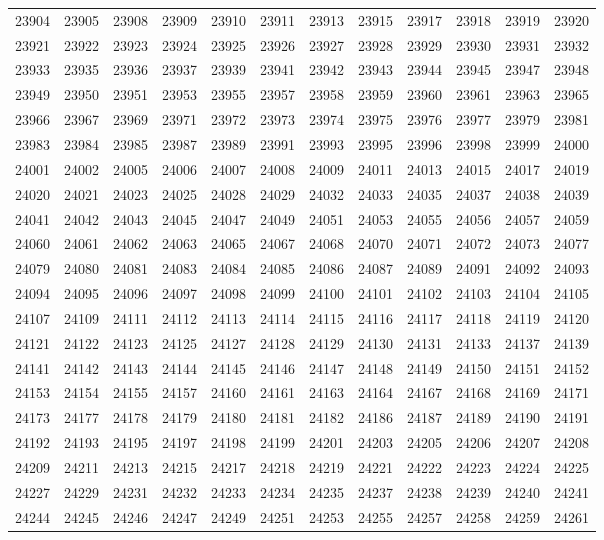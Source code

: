 \begin{center}
\begin{longtable}{llllllllllll}
23904 &23905 &23908 &23909 &23910 &23911 &23913 &23915 &23917 &23918 &23919 &23920 \\
23921 &23922 &23923 &23924 &23925 &23926 &23927 &23928 &23929 &23930 &23931 &23932 \\
23933 &23935 &23936 &23937 &23939 &23941 &23942 &23943 &23944 &23945 &23947 &23948 \\
23949 &23950 &23951 &23953 &23955 &23957 &23958 &23959 &23960 &23961 &23963 &23965 \\
23966 &23967 &23969 &23971 &23972 &23973 &23974 &23975 &23976 &23977 &23979 &23981 \\
23983 &23984 &23985 &23987 &23989 &23991 &23993 &23995 &23996 &23998 &23999 &24000 \\
24001 &24002 &24005 &24006 &24007 &24008 &24009 &24011 &24013 &24015 &24017 &24019 \\
24020 &24021 &24023 &24025 &24028 &24029 &24032 &24033 &24035 &24037 &24038 &24039 \\
24041 &24042 &24043 &24045 &24047 &24049 &24051 &24053 &24055 &24056 &24057 &24059 \\
24060 &24061 &24062 &24063 &24065 &24067 &24068 &24070 &24071 &24072 &24073 &24077 \\
24079 &24080 &24081 &24083 &24084 &24085 &24086 &24087 &24089 &24091 &24092 &24093 \\
24094 &24095 &24096 &24097 &24098 &24099 &24100 &24101 &24102 &24103 &24104 &24105 \\
24107 &24109 &24111 &24112 &24113 &24114 &24115 &24116 &24117 &24118 &24119 &24120 \\
24121 &24122 &24123 &24125 &24127 &24128 &24129 &24130 &24131 &24133 &24137 &24139 \\
24141 &24142 &24143 &24144 &24145 &24146 &24147 &24148 &24149 &24150 &24151 &24152 \\
24153 &24154 &24155 &24157 &24160 &24161 &24163 &24164 &24167 &24168 &24169 &24171 \\
24173 &24177 &24178 &24179 &24180 &24181 &24182 &24186 &24187 &24189 &24190 &24191 \\
24192 &24193 &24195 &24197 &24198 &24199 &24201 &24203 &24205 &24206 &24207 &24208 \\
24209 &24211 &24213 &24215 &24217 &24218 &24219 &24221 &24222 &24223 &24224 &24225 \\
24227 &24229 &24231 &24232 &24233 &24234 &24235 &24237 &24238 &24239 &24240 &24241 \\
24244 &24245 &24246 &24247 &24249 &24251 &24253 &24255 &24257 &24258 &24259 &24261 \\

\end{longtable}
\end{center}
